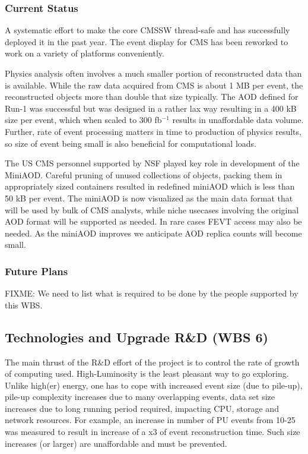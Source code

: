 \documentclass[11pt,a4paper]{article}
\begin{document}
\subsubsection{Current Status}

A systematic effort to make the core CMSSW thread-safe and has
successfully deployed it in the past year.  
The event display
for CMS has been reworked to work on a variety of platforms
conveniently.

Physics analysis often involves a much smaller portion of
reconstructed data than is available. While the raw data acquired from
CMS is about 1 MB per event, the reconstructed objects more than
double that size typically. The AOD defined for Run-1 was successful
but was designed in a rather lax way resulting in a 400 kB size per
event, which when scaled to 300 fb$^{-1}$ results in unaffordable
data volume. Further, rate of event processing matters in time to
production of physics results, so size of event being small is also
beneficial for computational loads. 

The US CMS personnel supported by NSF played key role in development
of the MiniAOD.  Careful pruning of unused collections of objects, packing them
in appropriately sized containers resulted in redefined miniAOD which
is less than 50 kB per event. The miniAOD is now visualized as the main data format that will
be used by bulk of CMS analysts, while niche usecases involving the
original AOD format will be supported as needed. In rare cases FEVT
access may also be needed.  As the miniAOD improves we anticipate AOD
replica counts will become small. 
\subsubsection{Future Plans}

{FIXME: We need to list what is required to be done by the people
  supported by this WBS.}

\subsection{Technologies and Upgrade R\&D (WBS 6)}

The main thrust of the R\&D effort of the project is to control the
rate of growth of computing used.  High-Luminosity is the least
pleasant way to go exploring. Unlike high(er) energy, one has to cope
with increased event size (due to pile-up), pile-up complexity
increases due to many overlapping events, data set size increases due
to long running period required, impacting CPU, storage and network
resources.  For example, an increase in number of PU events from 10-25
was measured to result in increase of a x3 of event reconstruction
time. Such size increases (or larger) are unaffordable and must be
prevented.
\end{document}
